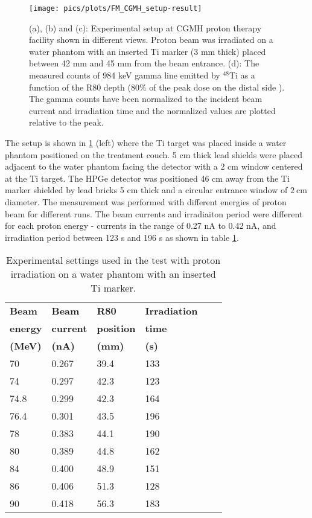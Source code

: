 \documentclass[11pt,a4paper]{article}
\begin{document}
\begin{figure}[h] 
\centering\texttt{[image: pics/plots/FM\_CGMH\_setup-result]}
\caption{(a), (b) and (c): Experimental setup at CGMH proton therapy facility shown in different views. Proton beam was irradiated on a water phantom with an inserted Ti  marker (3 mm thick) placed between 42 mm and 45 mm from the beam entrance. (d): The measured counts of 984 keV gamma line emitted by $\mathrm{^{48}Ti}$ as a function of the R80 depth (80\% of the peak dose on the distal side ). The gamma counts have been normalized to the incident beam current and irradiation time and the normalized values are plotted relative to the peak.}
\label{fig_FM_CGMH}
\end{figure}

The setup is shown in \ref{fig_FM_CGMH} (left) where the Ti target was placed inside a water phantom positioned on the treatment couch. 5 cm thick lead shields were placed adjacent to the water phantom facing the detector with a 2 cm window centered at the Ti target. The HPGe detector was positioned 46 cm away from the Ti marker shielded by lead bricks 5 cm thick and a circular entrance window of $\mathrm{2\ cm}$ diameter. The measurement was performed with different energies of proton beam for different runs. The beam currents and irradiaiton period were different for each proton energy - currents in the range of 0.27 nA to 0.42 nA, and irradiation period between 123 s and 196 s as shown in table \ref{table_FM_settings}. 

\begin{table}[]
\begin{center}
\caption{Experimental settings used in the test with proton irradiation on a water phantom with an inserted Ti marker. } \label{table_FM_settings}
\begin{tabular}{llllll} 
\hline
{\bf Beam   } & {\bf Beam   } & {\bf R80 } & {\bf Irradiation  } \\
{\bf  energy  } & {\bf  current  } & {\bf  position} & {\bf  time } \\
{\bf (MeV)  } &  {\bf (nA)  } & {\bf (mm)} & {\bf (s) } \\
\hline
70    & 0.267 & 39.4 &  133\\
74    & 0.297 & 42.3 &  123\\
74.8 & 0.299 & 42.3 &  164\\
76.4 & 0.301 & 43.5 &  196\\
78    & 0.383 & 44.1 &  190\\
80    & 0.389 & 44.8 &  162\\
84    & 0.400 & 48.9 &  151\\
86    & 0.406 & 51.3 &  128\\
90    & 0.418 & 56.3 &  183\\

\hline
\end {tabular}
\end {center}
\end {table}
\normalsize
\end{document}
